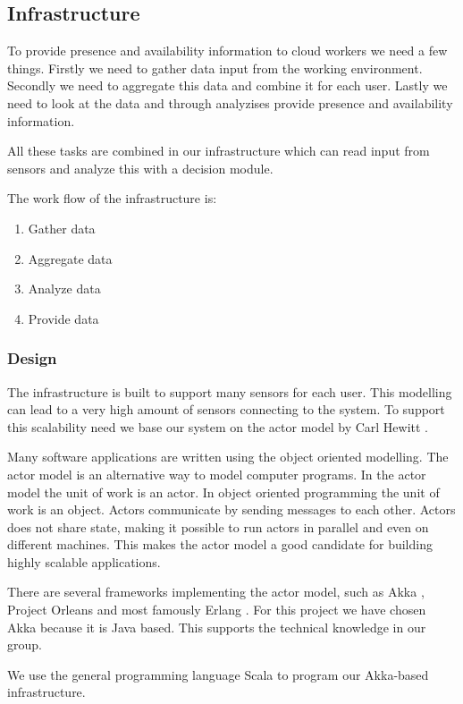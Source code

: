 \documentclass{sigchi}
\begin{document}
\subsection{Infrastructure}
To provide presence and availability information to cloud workers we need a few things.
Firstly we need to gather data input from the working environment.
Secondly we need to aggregate this data and combine it for each user.
Lastly we need to look at the data and through analyzises provide presence and availability information.

All these tasks are combined in our infrastructure which can read input from sensors and analyze this with a decision module.

The work flow of the infrastructure is:
\begin{enumerate}
  \item Gather data
  \item Aggregate data
  \item Analyze data
  \item Provide data
\end{enumerate}

\subsubsection{Design}
The infrastructure is built to support many sensors for each user.
This modelling can lead to a very high amount of sensors connecting to the system.
To support this scalability need we base our system on the actor model by Carl Hewitt \cite{hewitt1973universal}.

Many software applications are written using the object oriented modelling.
The actor model is an alternative way to model computer programs.
In the actor model the unit of work is an actor.
In object oriented programming the unit of work is an object.
Actors communicate by sending messages to each other.
Actors does not share state, making it possible to run actors in parallel and even on different machines.
This makes the actor model a good candidate for building highly scalable applications.

There are several frameworks implementing the actor model, such as Akka \cite{akka}, Project Orleans \cite{orleans} and most famously Erlang \cite{erlang}.
For this project we have chosen Akka because it is Java based.
This supports the technical knowledge in our group.

We use the general programming language Scala \cite{scala} to program our Akka-based infrastructure.
\end{document}
